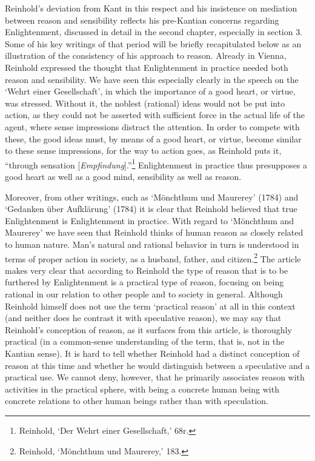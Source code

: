  Reinhold's deviation from Kant in this respect and his insistence on mediation between reason and sensibility reflects his pre{-}Kantian concerns regarding Enlightenment, discussed in detail in the second chapter, especially in section 3. Some of his key writings of that period will be briefly recapitulated below as an illustration of the consistency of his approach to reason. Already in Vienna, Reinhold expressed the thought that Enlightenment in practice needed both reason and sensibility. We have seen this especially clearly in the speech on the `Wehrt einer Gesellschaft', in which the importance of a good heart, or virtue, was stressed. Without it, the noblest (rational) ideas would not be put into action, as they could not be asserted with sufficient force in the actual life of the agent, where sense impressions distract the attention. In order to compete with these, the good ideas must, by means of a good heart, or virtue, become similar to these sense impressions, for the way to action goes, as Reinhold puts it, ``through sensation [\textit{Empfindung}].''\footnote{ Reinhold, `Der Wehrt einer Gesellschaft,' 68r.} Enlightenment in practice thus presupposes a good heart as well as a good mind, sensibility as well as reason. 

Moreover, from other writings, such as `M\"{o}nchthum und Maurerey' (1784) and `Gedanken \"{u}ber Aufkl\"{a}rung' (1784) it is clear that Reinhold believed that true Enlightenment is Enlightenment in practice. With regard to `M\"{o}nchthum and Maurerey' we have seen that Reinhold thinks of human reason as closely related to human nature. Man's natural and rational behavior in turn is understood in terms of proper action in society, as a husband, father, and citizen.\footnote{ Reinhold, `M\"{o}nchthum und Maurerey,' 183. } The article makes very clear that according to Reinhold the type of reason that is to be furthered by Enlightenment is a practical type of reason, focusing on being rational in our relation to other people and to society in general. Although Reinhold himself does not use the term `practical reason' at all in this context (and neither does he contrast it with speculative reason), we may say that Reinhold's conception of reason, as it surfaces from this article, is thoroughly practical (in a common{-}sense understanding of the term, that is, not in the Kantian sense). It is hard to tell whether Reinhold had a distinct conception of reason at this time and whether he would distinguish between a speculative and a practical use. We cannot deny, however, that he primarily associates reason with activities in the practical sphere, with being a concrete human being with concrete relations to other human beings rather than with speculation.

